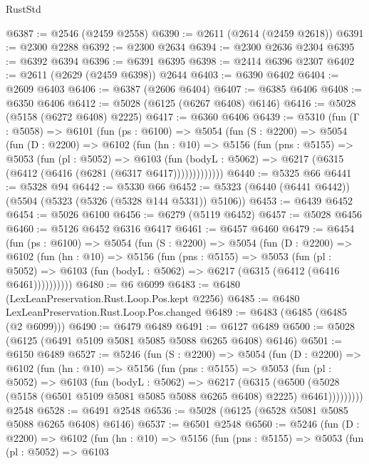 \begin{lexlean}{RustStd}
\begin{coremodule}
@6387 := @2546 (@2459 @2558)
@6390 := @2611 (@2614 (@2459 @2618))
@6391 := @2300 @2288
@6392 := @2300 @2634
@6394 := @2300 @2636 @2304
@6395 := @6392 @6394
@6396 := @6391 @6395
@6398 := @2414 @6396 @2307
@6402 := @2611 (@2629 (@2459 @6398)) @2644
@6403 := @6390 @6402
@6404 := @2609 @6403
@6406 := @6387 (@2606 @6404)
@6407 := @6385 @6406
@6408 := @6350 @6406
@6412 := @5028 (@6125 (@6267 @6408) @6146)
@6416 := @5028 (@5158 (@6272 @6408) @2225)
@6417 := @6360 @6406
@6439 := @5310
    (fun (Γ : @5058) =>
    @6101
      (fun (ps : @6100) =>
      @5054
        (fun (S : @2200) =>
        @5054
          (fun (D : @2200) =>
          @6102
            (fun (hn : @10) =>
            @5156
              (fun (pns : @5155) =>
              @5053
                (fun (pl : @5052) =>
                @6103
                  (fun (bodyL : @5062) =>
                  @6217 (@6315 (@6412 (@6416 (@6281 (@6317 @6417)))))))))))))
@6440 := @5325 @66
@6441 := @5328 @94
@6442 := @5330 @66
@6452 := @5323 (@6440 (@6441 @6442)) (@5504 (@5323 (@5326 (@5328 @144 @5331)) @5106))
@6453 := @6439 @6452
@6454 := @5026 @6100
@6456 := @6279 (@5119 @6452)
@6457 := @5028 @6456
@6460 := @5126 @6452 @6316 @6417
@6461 := @6457 @6460
@6479 := @6454
    (fun (ps : @6100) =>
    @5054
      (fun (S : @2200) =>
      @5054
        (fun (D : @2200) =>
        @6102
          (fun (hn : @10) =>
          @5156
            (fun (pns : @5155) =>
            @5053
              (fun (pl : @5052) =>
              @6103 (fun (bodyL : @5062) => @6217 (@6315 (@6412 (@6416 @6461))))))))))
@6480 := @6 @6099
@6483 := @6480 (LexLeanPreservation.Rust.Loop.Pos.kept @2256)
@6485 := @6480 LexLeanPreservation.Rust.Loop.Pos.changed
@6489 := @6483 (@6485 (@6485 (@2 @6099)))
@6490 := @6479 @6489
@6491 := @6127 @6489
@6500 := @5028 (@6125 (@6491 @5109 @5081 @5085 @5088 @6265 @6408) @6146)
@6501 := @6150 @6489
@6527 := @5246
    (fun (S : @2200) =>
    @5054
      (fun (D : @2200) =>
      @6102
        (fun (hn : @10) =>
        @5156
          (fun (pns : @5155) =>
          @5053
            (fun (pl : @5052) =>
            @6103
              (fun (bodyL : @5062) =>
              @6217
                (@6315
                  (@6500
                    (@5028 (@5158 (@6501 @5109 @5081 @5085 @5088 @6265 @6408) @2225) @6461)))))))))
    @2548
@6528 := @6491 @2548
@6536 := @5028 (@6125 (@6528 @5081 @5085 @5088 @6265 @6408) @6146)
@6537 := @6501 @2548
@6560 := @5246
    (fun (D : @2200) =>
    @6102
      (fun (hn : @10) =>
      @5156
        (fun (pns : @5155) =>
        @5053
          (fun (pl : @5052) =>
          @6103

\end{coremodule}
\end{lexlean}
